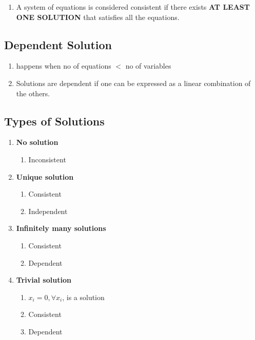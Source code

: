 \begin{enumerate}
    \item A system of equations is considered consistent if there exists \textbf{AT LEAST ONE SOLUTION} that satisfies all the equations.
\end{enumerate}


\subsection{Dependent Solution}\label{Dependent Solution of linear equations}

\begin{enumerate}
    \item happens when no of equations $<$ no of variables
    
    \item Solutions are dependent if one can be expressed as a linear combination of the others.
\end{enumerate}

\subsection{Types of Solutions}
\begin{enumerate}
    \item \textbf{No solution}
    \begin{enumerate}
        \item Inconsistent
    \end{enumerate}
    
    \item \textbf{Unique solution}
    \begin{enumerate}
        \item Consistent
        \item Independent
    \end{enumerate}

    \item \textbf{Infinitely many solutions}
    \begin{enumerate}
        \item Consistent
        \item Dependent
    \end{enumerate}

    \item \textbf{Trivial solution}
    \begin{enumerate}
        \item $x_i = 0, \forall x_i$, is a solution
        \item Consistent
        \item Dependent
    \end{enumerate}

\end{enumerate}


